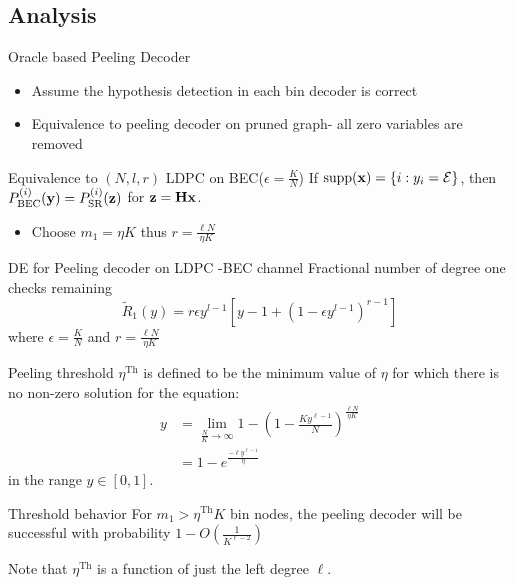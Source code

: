 \subsection{Analysis}
\begin{frame}{Oracle based Peeling Decoder}
\begin{itemize}
\item Assume the hypothesis detection in each bin decoder is correct
\item Equivalence to peeling decoder on pruned graph- all zero variables are removed
\end{itemize}
\begin{block}{Equivalence to $(N,l,r)$ LDPC on BEC($\epsilon=\frac{K}{N}$)}
If $\text{supp}(\mathbf{x})=\{i:y_i=\mathcal{E}\}$, then $P^{(i)}_{\text{BEC}}(\mathbf{y})=P^{(i)}_{\text{SR}}(\mathbf{z})$  for $\mathbf{z=Hx}$.
\end{block}
\begin{itemize}
\item Choose $m_1=\eta K$ thus $r=\frac{\ell N}{\eta K}$
\end{itemize}
\vspace{1ex}
\begin{block}{DE for Peeling decoder on LDPC -BEC channel}
Fractional number of degree one checks remaining
\begin{equation*}
\tilde{R}_1(y)=r\epsilon y^{l-1}[y-1+(1-\epsilon y^{l-1})^{r-1}]
\end{equation*}
where $\epsilon=\frac{K}{N}$ and $r=\frac{\ell N}{\eta K}$
\end{block}
\end{frame}

\begin{frame}{}
\begin{block}{Peeling threshold}
$\eta^{\text{Th}}$ is defined to be the minimum value of $\eta$ for which there is no non-zero solution for the equation:
\begin{align*}
y&=\lim_{\frac{N}{K}\rightarrow\infty}1-\left(1-\frac{Ky^{\ell-1}}{N}\right)^{\frac{\ell N}{\eta K}}\\
  &=1-e^{\frac{-\ell y^{\ell-1}}{\eta}}
\end{align*}
in the range $y\in [0,1]$.
\end{block}
\vspace{3ex}
\begin{block}{Threshold behavior}
For $m_1>\eta^{\text{Th}}K$ bin nodes, the peeling decoder will be successful with probability $1-O\left(\frac{1}{K^{\ell-2}}\right)$
\end{block}
Note that $\eta^{\text{Th}}$ is a function of just the left degree $\ell$.
\end{frame}

